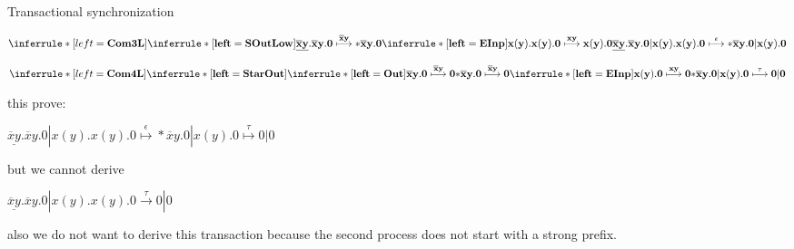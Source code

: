 \begin{example}Transactional synchronization
  \begin{center}
    $\inferrule*[left=\bf{Com3L}]{
      \inferrule*[left=\bf{SOutLow}]{
      }{
	\underline{\overline{x}y}.\overline{x}y.0 
	  \stackrel{\overline{x}y}{\longmapsto}
	    *\overline{x}y.0
      } 
    \\
      \inferrule*[left=\bf{EInp}]{	
      }{
	x(y).x(y).0
	  \stackrel{xy}{\longmapsto}
	    x(y).0
      }
    }{
      \underline{\overline{x}y}.\overline{x}y.0 | x(y).x(y).0
	\stackrel{\epsilon}{\longmapsto}
	  *\overline{x}y.0 | x(y).0
    }$
  \end{center}
  \begin{center}
    $\inferrule*[left=\bf{Com4L}]{
      \inferrule*[left=\bf{StarOut}]{
	\inferrule*[left=\bf{Out}]{
	}{
	  \overline{x}y.0 
	    \stackrel{\overline{x}y}{\longmapsto}
	      0
	} 
      }{
	  *\overline{x}y.0 
	    \stackrel{\overline{x}y}{\longmapsto}
	      0
      }
    \\
      \inferrule*[left=\bf{EInp}]{	
      }{
	x(y).0
	  \stackrel{xy}{\longmapsto}
	    0
      }
    }{
      *\overline{x}y.0 | x(y).0
	\stackrel{\tau}{\longmapsto}
	  0 | 0
    }$
  \end{center}
  this prove:
  \begin{center}
    $\underline{\overline{x}y}.\overline{x}y.0 | x(y).x(y).0
	\stackrel{\epsilon}{\longmapsto}
	  *\overline{x}y.0 | x(y).0
	    \stackrel{\tau}{\longmapsto}
	      0 | 0$
  \end{center}
  but we cannot derive 
  \begin{center}
    $\underline{\overline{x}y}.\overline{x}y.0 | x(y).x(y).0
      \xrightarrow{\tau}
	0 | 0$
  \end{center}
  also we do not want to derive this transaction because the second process does not start with a strong prefix.
\end{example}


